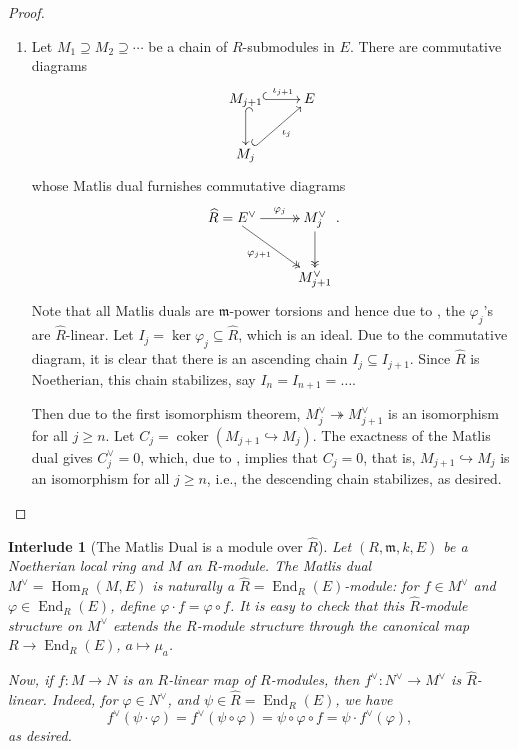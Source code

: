 \documentclass[10pt]{article}
\theoremstyle{thmstyle}
\theoremstyle{defstyle}
\newtheorem{interlude}[theorem]{Interlude}
\newcommand{\Hom}{\operatorname{Hom}}
\newcommand{\End}{\operatorname{End}}
\newcommand{\coker}{\operatorname{coker}}
\newcommand{\frakm}{\mathfrak{m}} %
\newcommand{\wh}[1]{\widehat{#1}}
\newcommand{\onto}{\twoheadrightarrow}
\newcommand{\into}{\hookrightarrow}
\renewcommand{\ge}{\geqslant}
\begin{document}
\begin{proof}
\begin{enumerate}[label=(\arabic*)]
    \item Let $M_1\supseteq M_2\supseteq\cdots$ be a chain of $R$-submodules in $E$. There are commutative diagrams 
    \begin{equation*}
        \xymatrix {
            M_{j + 1}\ar@{^{(}->}[r]^-{\iota_{j + 1}}\ar@{^{(}->}[d] & E\\
            M_j\ar@{^{(}->}[ru]_-{\iota_j}
        }
    \end{equation*}
    whose Matlis dual furnishes commutative diagrams 
    \begin{equation*}
        \xymatrix {
            \wh R = E^\vee\ar@{->>}[r]^-{\varphi_j}\ar@{->>}[rd]_-{\varphi_{j + 1}} & M_{j}^\vee\ar@{->>}[d] \\
            & M_{j + 1}^\vee
        }.
    \end{equation*}
    Note that all Matlis duals are $\frakm$-power torsions and hence due to , the $\varphi_j$'s are $\wh R$-linear. Let $I_j = \ker\varphi_j\subseteq\wh R$, which is an ideal. Due to the commutative diagram, it is clear that there is an ascending chain $I_j\subseteq I_{j + 1}$. Since $\wh R$ is Noetherian, this chain stabilizes, say $I_n = I_{n + 1} = \dots$. 
    
    Then due to the first isomorphism theorem, $M_j^\vee\onto M_{j + 1}^\vee$ is an isomorphism for all $j\ge n$. Let $C_j = \coker\left(M_{j + 1}\into M_j\right)$. The exactness of the Matlis dual gives $C_j^\vee = 0$, which, due to , implies that $C_j = 0$, that is, $M_{j + 1}\into M_j$ is an isomorphism for all $j\ge n$, i.e., the descending chain stabilizes, as desired. \qedhere
\end{enumerate}
\end{proof}

\begin{interlude}[The Matlis Dual is a module over $\wh R$]
    Let $(R,\frakm, k, E)$ be a Noetherian local ring and $M$ an $R$-module. The Matlis dual $M^\vee = \Hom_R(M, E)$ is naturally a $\wh R = \End_R(E)$-module: for $f\in M^\vee$ and $\varphi\in\End_R(E)$, define $\varphi\cdot f = \varphi\circ f$. It is easy to check that this $\wh R$-module structure on $M^\vee$ extends the $R$-module structure through the canonical map $R\to\End_R(E)$, $a\mapsto\mu_a$.

    Now, if $f: M\to N$ is an $R$-linear map of $R$-modules, then $f^\vee: N^\vee\to M^\vee$ is $\wh R$-linear. Indeed, for $\varphi\in N^\vee$, and $\psi\in\wh R = \End_R(E)$, we have 
    \begin{equation*}
        f^\vee\left(\psi\cdot\varphi\right) = f^\vee\left(\psi\circ\varphi\right) = \psi\circ\varphi\circ f = \psi\cdot f^\vee\left(\varphi\right),
    \end{equation*}
    as desired.
\end{interlude}
\end{document}
